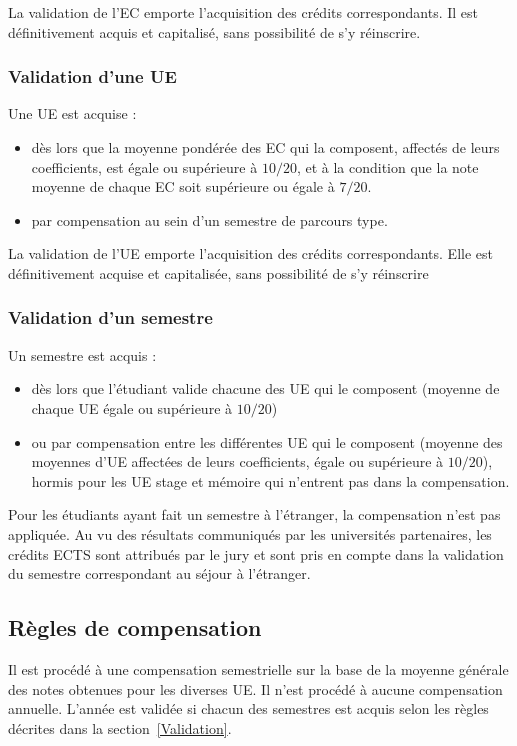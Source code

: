 \documentclass[a4paper,11pt]{article}
\begin{document}
La validation de l'EC emporte l'acquisition des crédits correspondants. Il est définitivement acquis et capitalisé, sans possibilité de s'y réinscrire.

\subsubsection{Validation d'une UE}
Une UE est acquise :
\begin{itemize}
	\item dès lors que la moyenne pondérée des EC qui la composent, affectés de leurs coefficients, est égale ou supérieure à $10/20$, et à la condition que la note moyenne de chaque EC soit supérieure ou égale à $7/20$.
	\item par compensation au sein d'un semestre de parcours type.
\end{itemize}

La validation de l'UE emporte l'acquisition des crédits correspondants. Elle est définitivement acquise et capitalisée, sans possibilité de s'y réinscrire


\subsubsection{Validation d'un semestre}

Un semestre est acquis :
\begin{itemize}
	\item dès lors que l'étudiant valide chacune des UE qui le composent (moyenne de chaque UE égale ou supérieure à $10/20$)
	\item ou par compensation entre les différentes UE qui le composent (moyenne des moyennes d'UE affectées de leurs coefficients, égale ou supérieure à $10/20$), hormis pour les UE stage et mémoire qui n'entrent pas dans la compensation.
\end{itemize}

Pour les étudiants ayant fait un semestre à l'étranger, la compensation n'est pas appliquée. Au vu des résultats communiqués par les universités partenaires, les crédits ECTS sont attribués par le jury et sont pris en compte dans la validation du semestre correspondant au séjour à l'étranger.



\subsection{Règles de compensation}
Il est procédé à une compensation semestrielle sur la base de la moyenne générale des notes obtenues pour les diverses UE.
Il n'est procédé à aucune compensation annuelle. L'année est validée si chacun des semestres est acquis selon les règles décrites dans la section~\ref{Validation}.
\end{document}
